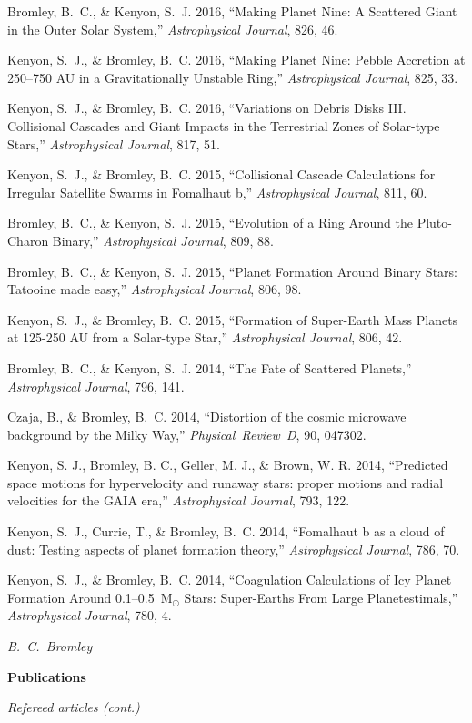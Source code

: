\documentclass[11pt]{article}
\def\refitem{} %
\def\defsty{\setlength{\parskip}{11pt}
\setlength{\oddsidemargin}{0.0in}
\setlength{\evensidemargin}{0.0in}
\setlength{\parindent}{0in}}
\def\bibsty{\setlength{\parskip}{0pt}
\setlength{\oddsidemargin}{0.33in}
\setlength{\evensidemargin}{0.33in}
\setlength{\parindent}{-0.33in}}
\newcommand{\shead}[1]{\vspace{12.5pt}\centerline{{\bf{#1}}}}
\begin{document}
\refitem Bromley, B.~C., \& Kenyon, S.~J. 2016, ``Making Planet Nine:
A Scattered Giant in the Outer Solar System,'' {\em Astrophysical
  Journal}, 826, 46.

\refitem Kenyon, S.~J., \& Bromley, B.~C. 2016, ``Making Planet Nine:
Pebble Accretion at 250--750 AU in a Gravitationally Unstable Ring,''
{\em Astrophysical Journal}, 825, 33.

\refitem Kenyon, S.~J., \& Bromley, B.~C. 2016, ``Variations on Debris
Disks III. Collisional Cascades and Giant Impacts in the Terrestrial
Zones of Solar-type Stars,'' {\em Astrophysical Journal}, 817, 51.

\refitem Kenyon, S.~J., \& Bromley, B.~C. 2015, ``Collisional Cascade
Calculations for Irregular Satellite Swarms in Fomalhaut b,'' {\em
  Astrophysical Journal}, 811, 60.

\refitem Bromley, B.~C., \& Kenyon, S.~J. 2015, ``Evolution of a Ring Around 
the Pluto-Charon Binary,'' {\em Astrophysical Journal}, 809, 88.

\refitem Bromley, B.~C., \& Kenyon, S.~J. 2015, ``Planet Formation
Around Binary Stars: Tatooine made easy,'' {\em Astrophysical
  Journal}, 806, 98.

\refitem Kenyon, S.~J., \& Bromley, B.~C. 2015, ``Formation of
Super-Earth Mass Planets at 125-250 AU from a Solar-type Star,'' 
{\em Astrophysical Journal}, 806, 42.


\refitem Bromley, B.~C., \& Kenyon, S.~J. 2014, ``The Fate of
Scattered Planets,'' {\em Astrophysical Journal}, 796, 141.

\refitem Czaja, B., \& Bromley, B.~C. 2014, ``Distortion of the cosmic
microwave background by the Milky Way,'' {\em Physical\ Review\ D},
90, 047302.

\refitem Kenyon, S. J., Bromley, B. C., Geller, M. J., \& Brown,
W. R. 2014, ``Predicted space motions for hypervelocity and runaway
stars: proper motions and radial velocities for the GAIA era,''
{\em Astrophysical Journal}, 793, 122.

\refitem Kenyon, S.~J., Currie, T., \& Bromley, B.~C. 2014,
``Fomalhaut b as a cloud of dust: Testing aspects of planet formation
theory,'' {\em Astrophysical Journal}, 786, 70.

\refitem Kenyon, S.~J., \& Bromley, B.~C. 2014, ``Coagulation
Calculations of Icy Planet Formation Around 0.1--0.5~M$_\odot$ Stars:
Super-Earths From Large Planetestimals,'' {\em Astrophysical Journal},
780, 4.

\newpage
\defsty
\mbox{} \hfill {\it B.\ C.\ Bromley}
\vspace{-11pt}
\shead{Publications}
\centerline{\em Refereed articles (cont.)}
\vspace{-5.5pt}
\bibsty
\end{document}
